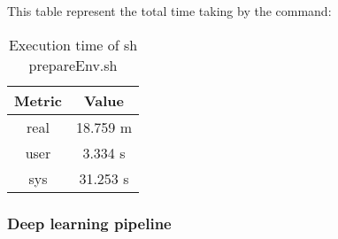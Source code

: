 \begin{itemize}
This table represent the total time taking by the command:
\begin{table}[h]
    \centering
    \begin{tabular}{|c|c|}
        \hline
        \textbf{Metric} & \textbf{Value} \\
        \hline
        real & 18.759 m \\
        \hline
        user & 3.334 s \\
        \hline
        sys & 31.253 s \\
        \hline
    \end{tabular}
    \caption{Execution time of sh prepareEnv.sh}
    \label{tab:time}
\end{table}

\end{itemize}
\subsubsection{Deep learning pipeline}
